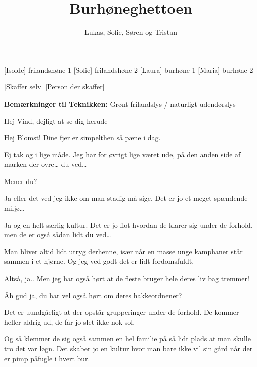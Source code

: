 \documentclass[a4paper,11pt]{article}
\title{Burhøneghettoen}
\author{Lukas, Sofie, Søren og Tristan}
\begin{document}
\maketitle

\begin{roles}
    [Isolde] frilandshøne 1
    [Sofie] frilandshøne 2
    [Laura] burhøne 1
    [Maria] burhøne 2
\end{roles}

\begin{props}
    [Skaffer selv]
    [Person der skaffer]
\end{props}

\textbf{Bemærkninger til Teknikken:} Grønt frilandslys / naturligt udendørslys

\begin{sketch}



 Hej Vind, dejligt at se dig herude

 Hej Blomst! Dine fjer er simpelthen så pæne i dag.

 Ej tak og i lige måde. Jeg har for øvrigt lige været ude, på den anden side af marken der ovre… du ved…

 Mener du?

 Ja eller det ved jeg ikke om man stadig må sige. Det er jo et meget spændende miljø…

 Ja og en helt særlig kultur. Det er jo flot hvordan de klarer sig under de forhold, men de er også sådan lidt du ved…

 Man bliver altid lidt utryg derhenne, især når en masse unge kamphaner står sammen i et hjørne. Og jeg ved godt det er lidt fordomsfuldt.

 Altså, ja.. Men jeg har også hørt at de fleste bruger hele deres liv bag tremmer!

 Åh gud ja, du har vel også hørt om deres hakkeordnener?

 Det er uundgåeligt at der opstår grupperinger under de forhold. De kommer heller aldrig ud, de får jo slet ikke nok sol.

 Og så klemmer de sig også sammen en hel familie på så lidt plads at man skulle tro det var løgn. Det skaber jo en kultur hvor man bare ikke vil sin gård når der er pimp påfugle i hvert bur.


\end{sketch}
\end{document}
